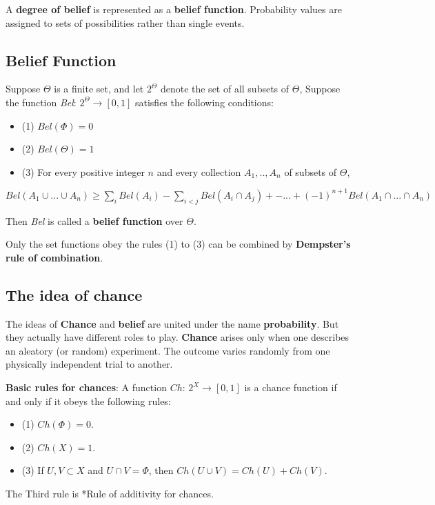 \documentclass[11pt]{article}
\begin{document}
A \textbf{degree of belief} is represented as a \textbf{belief function}. Probability values
are assigned to sets of possibilities rather than single events.



\subsection{Belief Function}
\label{sec:org47e734b}

    Suppose \(\Theta\) is a finite set, and let \(2 ^ \Theta\) denote the set of all
subsets of \(\Theta\), Suppose the function \emph{Bel}: \(2^\Theta \rightarrow [0,1]\)
satisfies the following conditions:
\begin{itemize}
\item (1) \(Bel (\Phi)=0\)
\item (2) \(Bel (\Theta) = 1\)
\item (3) For every positive integer \(n\) and every collection \(A_1,..,A_n\) of
subsets of \(\Theta\),
\end{itemize}
\(Bel(A_1\cup ... \cup A_n) \ge \sum_i Bel(A_i) - \sum_{i<j} Bel(A_i \cap A_j)
+-...+(-1)^{n+1}Bel(A_1\cap...\cap A_n)\)

Then \emph{Bel} is called a \textbf{belief function} over \(\Theta\).

    Only the set functions obey the rules (1) to (3) can be combined by \textbf{Dempster's
rule of combination}.

\subsection{The idea of chance}
\label{sec:org49d202e}

    The ideas of \textbf{Chance} and \textbf{belief} are united under the name \textbf{probability}. But
they actually have different roles to play. \textbf{Chance} arises only when one
describes an aleatory (or random) experiment. The outcome varies randomly from
one physically independent trial to another.

\textbf{Basic rules for chances}: A function \(Ch\): \(2^X \rightarrow [0,1]\) is a chance
function if and only if it obeys the following rules:
\begin{itemize}
\item (1) \(Ch(\Phi) = 0\).
\item (2) \(Ch(X) = 1\).
\item (3) If \(U, V \subset X\) and \(U\cap V = \Phi\), then \(Ch(U\cup V) = Ch(U) +
  Ch(V)\).
\end{itemize}
The Third rule is *Rule of additivity for chances.
\end{document}
